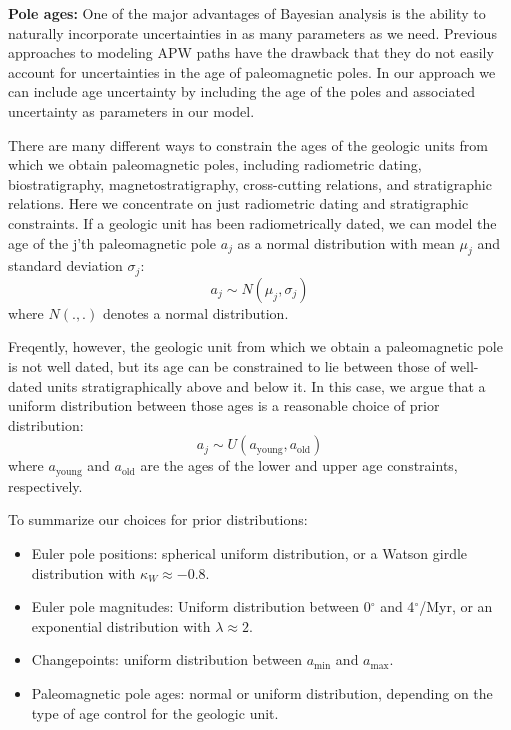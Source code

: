 \documentclass[preprint,12pt,authoryear]{elsarticle}
\begin{document}
\textbf{Pole ages:}
One of the major advantages of Bayesian analysis is the ability to naturally incorporate
uncertainties in as many parameters as we need. Previous approaches to
modeling APW paths have the drawback that they do not easily account for uncertainties in
the age of paleomagnetic poles. In our approach we can include age uncertainty
by including the age of the poles and associated uncertainty as parameters in our model.

There are many different ways to constrain the ages of the geologic units from
which we obtain paleomagnetic poles, including radiometric dating, biostratigraphy,
magnetostratigraphy, cross-cutting relations, and stratigraphic relations.
Here we concentrate on just radiometric dating and stratigraphic constraints.
If a geologic unit has been radiometrically dated, we can model the age of
the j'th paleomagnetic pole $a_j$ as a normal distribution with mean $\mu_j$ and standard deviation $\sigma_j$:
\begin{equation}
a_j \sim N(\mu_j, \sigma_j)
\end{equation}
where $N(.,.)$ denotes a normal distribution.

Freqently, however, the geologic unit from which we obtain a paleomagnetic pole
is not well dated, but its age can be constrained to lie between those
of well-dated units stratigraphically above and below it. In this case,
we argue that a uniform distribution between those ages is a reasonable choice
of prior distribution:
\begin{equation}
a_j \sim U(a_\mathrm{young}, a_\mathrm{old})
\end{equation}
where $a_\mathrm{young}$ and $a_\mathrm{old}$ are the ages of the lower and upper
age constraints, respectively.

To summarize our choices for prior distributions:
\begin{itemize}
\item Euler pole positions: spherical uniform distribution, or a Watson girdle distribution with $\kappa_W \approx -0.8$.
\item Euler pole magnitudes: Uniform distribution between 0$^\circ$ and 4$^\circ$/Myr, or an exponential distribution with $\lambda \approx 2$.
\item Changepoints: uniform distribution between $a_\mathrm{min}$ and $a_\mathrm{max}$.
\item Paleomagnetic pole ages: normal or uniform distribution, depending on the type of age control for the geologic unit.
\end{itemize}
\end{document}
